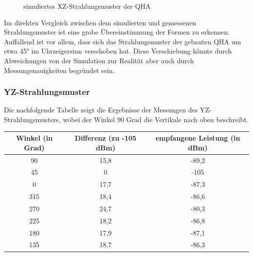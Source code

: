 \begin{figure}[H]
\begin{minipage}[b]{.4\linewidth}
	\label{fig:XZradiationsim}
	\caption{simuliertes XZ-Strahlungsmuster der QHA}
\end{minipage}
\end{figure}

Im direkten Vergleich zwischen dem simulierten und gemessenen Strahlungsmuster ist eine grobe Übereinstimmung der Formen zu erkennen. Auffallend ist vor allem, dass sich das Strahlungsmuster der gebauten QHA um etwa 45° im Uhrzeigersinn verschoben hat. Diese Verschiebung könnte durch Abweichungen von der Simulation zur Realität aber auch durch Messungenauigkeiten begründet sein. 

\subsubsection{YZ-Strahlungsmuster}
Die nachfolgende Tabelle zeigt die Ergebnisse der Messungen des YZ-Strahlungsmusters, wobei der Winkel 90 Grad die Vertikale nach oben beschreibt.

\begin{tabular}{|c|c|c|}
	\hline
	\textbf{Winkel (in Grad)} & \textbf{Differenz (zu -105 dBm)} & \textbf{empfangene Leistung (in dBm)} \\
	\hline
	90 & 15,8 & -89,2 \\
	\hline
	45 & 0 & -105 \\
	\hline
	0 & 17,7 & -87,3 \\
	\hline
	315 & 18,4 & -86,6 \\
	\hline
	270 & 24,7 & -80,3 \\
	\hline
	225 & 18,2 & -86,8 \\
	\hline
	180 & 17,9 & -87,1 \\
	\hline
	135 & 18,7 & -86,3 \\
	\hline
\end{tabular}

